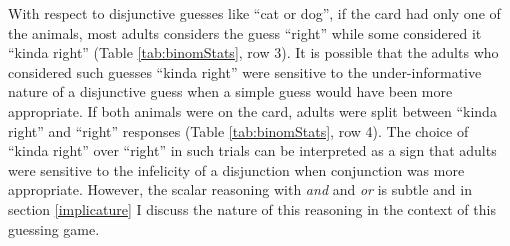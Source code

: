 \documentclass[oneside]{report}
\theoremstyle{definition}
\theoremstyle{definition}
\theoremstyle{definition}
\theoremstyle{remark}
\begin{document}
With respect to disjunctive guesses like ``cat or dog'', if the card had
only one of the animals, most adults considers the guess ``right'' while
some considered it ``kinda right'' (Table \ref{tab:binomStats}, row 3).
It is possible that the adults who considered such guesses ``kinda
right'' were sensitive to the under-informative nature of a disjunctive
guess when a simple guess would have been more appropriate. If both
animals were on the card, adults were split between ``kinda right'' and
``right'' responses (Table \ref{tab:binomStats}, row 4). The choice of
``kinda right'' over ``right'' in such trials can be interpreted as a
sign that adults were sensitive to the infelicity of a disjunction when
conjunction was more appropriate. However, the scalar reasoning with
\emph{and} and \emph{or} is subtle and in section \ref{implicature} I
discuss the nature of this reasoning in the context of this guessing
game.
\end{document}
